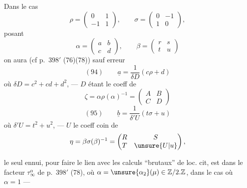 Dans le cas 
\[
\rho=\begin{pmatrix}0&1\\-1&1\end{pmatrix},\qquad
\sigma=\begin{pmatrix}0&-1\\1&0\end{pmatrix},
\]
posant
\[
\alpha=\begin{pmatrix}a&b\\c&d\end{pmatrix},\qquad
\beta=\begin{pmatrix}r&s\\t&u\end{pmatrix}
\]
on aura (cf p.\ $398'$ (76)(78)) sauf erreur
\[
(94)\qquad \underline a=\frac1{\delta D}(c\rho+d)
\]
\inserted{\[
\left(=\frac1{c^2+cd+d^2}(c\rho+d)\right)
\]}
où $\delta D=c^2+cd+d^2$, --- $D$ étant le coeff  de
\[
\zeta=\alpha\rho(\alpha)^{-1}=\begin{pmatrix}A&B\\C&D\end{pmatrix}
\]
\[
(95)\qquad \underline b=\frac1{\delta' U}(t\sigma+u)
\]
\inserted{\[
=\frac1{t^2+u^2}(t\sigma+u)
\]}
où $\delta' U=t^2+u^2$, --- $U$ le coeff coin de
\[
\eta=\beta\sigma(\beta)^{-1}=\begin{pmatrix}R&S\\T&\unsure{U|u}\end{pmatrix},
\]

le seul ennui, pour faire le lien avec les calculs ``brutaux'' de loc. cit, est dans le facteur $\tau_\infty^\alpha$ de p.\ $398'$ (78), où $\alpha=\unsure{\alpha_2}(\mu)\in\mathbb Z/2.\mathbb Z$, dans le cas où $\alpha=1$ ---




